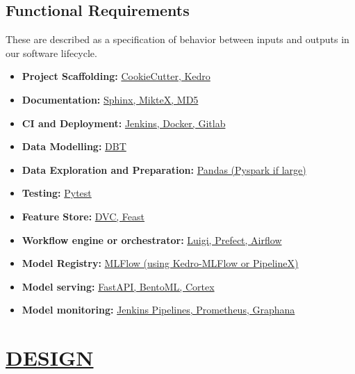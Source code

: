 \documentclass[12pt,oneside,a4paper]{report}
\begin{document}
\section{Functional Requirements}
These are described as a specification of behavior between inputs and outputs in our software lifecycle.
\begin{itemize}
\item    \textbf{Project Scaffolding:} \underline{CookieCutter, Kedro}
\item 	 \textbf{Documentation:} \underline{Sphinx, MikteX, MD5}
\item    \textbf{CI and Deployment:} \underline{Jenkins, Docker, Gitlab}
\item    \textbf{Data Modelling:} \underline{DBT}
\item    \textbf{Data Exploration and Preparation:} \underline{Pandas (Pyspark if large)}
\item    \textbf{Testing:} \underline{Pytest}
\item    \textbf{Feature Store:} \underline{DVC, Feast}
\item    \textbf{Workflow engine or orchestrator:} \underline{Luigi, Prefect, Airflow}
\item    \textbf{Model Registry:} \underline{MLFlow (using Kedro-MLFlow or PipelineX)}
\item    \textbf{Model serving:} \underline{FastAPI, BentoML, Cortex}
\item    \textbf{Model monitoring:} \underline{Jenkins Pipelines, Prometheus, Graphana}
\end{itemize}


\chapter{\underline{DESIGN}}
\end{document}
